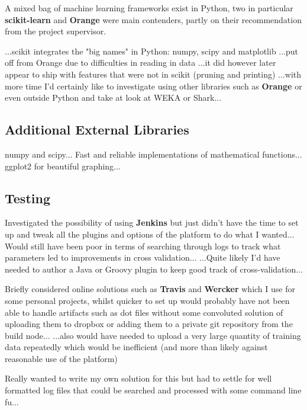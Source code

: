 A mixed bag of machine learning frameworks exist in Python, two in particular
\textbf{scikit-learn}\citep{scikit-learn} and \textbf{Orange}\citep{orange}
were main contenders, partly on their recommendation from the project
supervisor.

...scikit integrates the "big names" in Python: numpy, scipy and matplotlib
...put off from Orange due to difficulties in reading in data ...it did however
later appear to ship with features that were not in scikit (pruning and
printing) ...with more time I'd certainly like to investigate using other
libraries such as \textbf{Orange} or even outside Python and take at look at WEKA
or Shark...

\subsection{Additional External Libraries}
numpy\citep{numpyscipy} and scipy\citep{scipy}... Fast and reliable implementations of
mathematical functions...  ggplot2\citep{ggplot2} for beautiful graphing...


\subsection{Testing}
Investigated the possibility of using \textbf{Jenkins}
but just didn't have the time to set up and tweak all the plugins and options of
the platform to do what I wanted... Would still have been poor in terms of
searching through logs to track what parameters led to improvements in cross
validation... ...Quite likely I'd have needed to author a Java or Groovy plugin
to keep good track of cross-validation...

Briefly considered online solutions such as \textbf{Travis} and \textbf{Wercker}
which I use for some personal projects, whilst quicker to set up would probably
have not been able to handle artifacts such as dot files without some convoluted
solution of uploading them to dropbox or adding them to a private git repository
from the build node...  ...also would have needed to upload a very large
quantity of training data repeatedly which would be inefficient (and more than
likely against reasonable use of the platform)

Really wanted to write my own solution for this but had to settle for well
formatted log files that could be searched and processed with some command line
fu...

